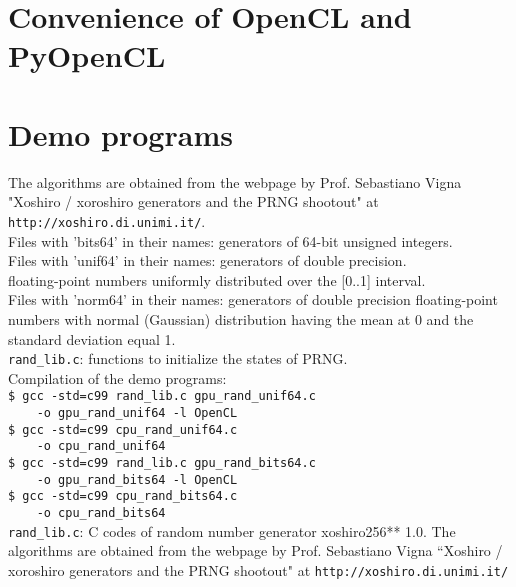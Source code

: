 \documentclass[preprint2]{aastex}
\begin{document}
\section{Convenience of OpenCL and PyOpenCL}\label{pyopencl}

 
\section{Demo programs}\label{demo}

The algorithms are obtained from the webpage  by Prof. Sebastiano Vigna
"Xoshiro / xoroshiro generators and the PRNG shootout" at \\
\verb|http://xoshiro.di.unimi.it/|. \\

Files with 'bits64' in their names: generators of 64-bit unsigned integers. \\
Files with 'unif64' in their names: generators of double precision. \\
    floating-point numbers uniformly distributed over the [0..1] interval. \\
Files with 'norm64' in their names: generators of double precision 
    floating-point numbers with normal (Gaussian) distribution having the mean
    at 0 and the standard deviation equal 1. \\


\verb|rand_lib.c|: functions to initialize the states of PRNG. \\

Compilation of the demo programs: \\
\verb|$ gcc -std=c99 rand_lib.c gpu_rand_unif64.c| \\
\verb|    -o gpu_rand_unif64 -l OpenCL| \\
\verb|$ gcc -std=c99 cpu_rand_unif64.c | \\
\verb|    -o cpu_rand_unif64| \\
\verb|$ gcc -std=c99 rand_lib.c gpu_rand_bits64.c | \\
\verb|    -o gpu_rand_bits64 -l OpenCL| \\
\verb|$ gcc -std=c99 cpu_rand_bits64.c | \\
\verb|    -o cpu_rand_bits64| \\



\verb|rand_lib.c|: C codes of random number generator xoshiro256** 1.0. 
The algorithms are obtained from the webpage by Prof. Sebastiano Vigna
``Xoshiro / xoroshiro generators and the PRNG shootout" at
\verb|http://xoshiro.di.unimi.it/| \\
\end{document}
